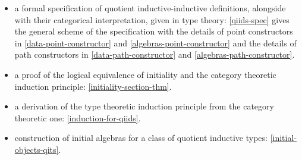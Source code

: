 \begin{itemize}
\item a formal specification of quotient inductive-inductive
  definitions, alongside with their categorical interpretation, given
  in type theory: \cref{qiids-spec} gives the general scheme of the
  specification with the details of point constructors in
  \cref{data-point-constructor} and \cref{algebras-point-constructor}
  and the details of path constructors in \cref{data-path-constructor}
  and \cref{algebras-path-constructor}.
\item a proof of the logical equivalence of initiality and the
  category theoretic induction principle:
  \cref{initiality-section-thm}.
\item a derivation of the type theoretic induction principle from the
  category theoretic one: \cref{induction-for-qiids}.
\item construction of initial algebras for a class of quotient
  inductive types: \cref{initial-objects-qits}.
\end{itemize}

